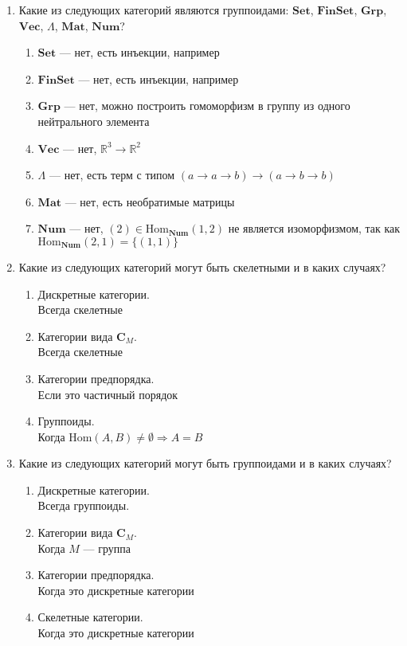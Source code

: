 \documentclass[draft]{article}
\newcommand{\cat}[1]{\mathbf{#1}}
\renewcommand{\C}{\cat{C}}
\newcommand{\Set}{\cat{Set}}
\newcommand{\FinSet}{\cat{FinSet}}
\newcommand{\Grp}{\cat{Grp}}
\renewcommand{\Vec}{\cat{Vec}}
\newcommand{\Mat}{\cat{Mat}}
\newcommand{\Num}{\cat{Num}}
\newcommand{\fs}[1]{\mathrm{#1}}
\newcommand{\Hom}{\fs{Hom}}
\begin{document}
\begin{enumerate}
\item Какие из следующих категорий являются группоидами: $\Set$, $\FinSet$, $\Grp$, $\Vec$, $\Lambda$, $\Mat$, $\Num$?

\begin{enumerate}
\item $\Set$ --- нет, есть инъекции, например
\item $\FinSet$ --- нет, есть инъекции, например
\item $\Grp$ --- нет, можно построить гомоморфизм в группу из одного нейтрального элемента
\item $\Vec$ --- нет, $\mathbb{R}^3 \to \mathbb{R}^2$
\item $\Lambda$ --- нет, есть терм с типом $(a\to a\to b)\to (a\to b\to b)$
\item $\Mat$ --- нет, есть необратимые матрицы
\item $\Num$ --- нет, $(2) \in \Hom_\Num(1, 2)$ не является изоморфизмом, так как $\Hom_\Num(2, 1) = \lbrace (1, 1) \rbrace$
\end{enumerate}


\item Какие из следующих категорий могут быть скелетными и в каких случаях?
\begin{enumerate}
\item Дискретные категории.\\
		Всегда скелетные
\item Категории вида $\C_M$.\\
		Всегда скелетные
\item Категории предпорядка.\\
		Если это частичный порядок
\item Группоиды.\\
		Когда $ \Hom(A, B) \neq \emptyset \Rightarrow A = B$
\end{enumerate}


\item Какие из следующих категорий могут быть группоидами и в каких случаях?
\begin{enumerate}
\item Дискретные категории.\\
		Всегда группоиды.
\item Категории вида $\C_M$.\\
		Когда $M$ --- группа
\item Категории предпорядка.\\
		Когда это дискретные категории
\item Скелетные категории.\\
		Когда это дискретные категории
\end{enumerate}


\end{enumerate}
\end{document}
